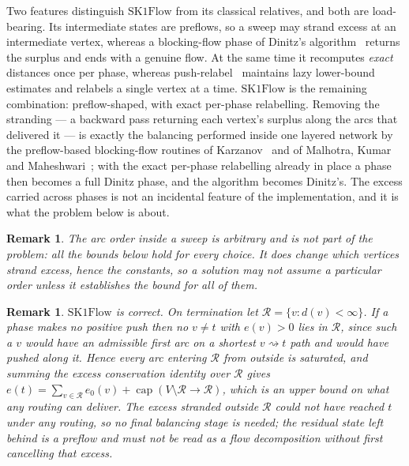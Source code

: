 \documentclass[10pt]{article}
\newtheorem{remark}[theorem]{Remark}
\newcommand{\SKF}{\text{SK1Flow}}
\DeclareMathOperator{\capa}{cap}
\begin{document}
Two features distinguish $\SKF$ from its classical relatives, and both are
load-bearing. Its intermediate states are preflows, so a sweep may strand
excess at an intermediate vertex, whereas a blocking-flow phase of Dinitz's
algorithm~\cite{Dinitz70} returns the surplus and ends with a genuine flow.
At the same time it recomputes \emph{exact} distances once per phase, whereas
push-relabel~\cite{GoldbergTarjan88} maintains lazy lower-bound estimates and
relabels a single vertex at a time. $\SKF$ is the remaining combination:
preflow-shaped, with exact per-phase relabelling.
Removing the stranding --- a backward pass returning each vertex's surplus along
the arcs that delivered it --- is exactly the balancing performed inside one
layered network by the preflow-based blocking-flow routines of
Karzanov~\cite{Karzanov74} and of Malhotra, Kumar and
Maheshwari~\cite{MKM78}; with the exact per-phase relabelling already in place a
phase then becomes a full Dinitz phase, and the algorithm becomes Dinitz's. The
excess carried across phases is not an incidental feature of the implementation,
and it is what the problem below is about.

\begin{remark}\label{rem:order}
The arc order inside a sweep is arbitrary and is not part of the problem: all
the bounds below hold for every choice. It does change \emph{which} vertices
strand excess, hence the constants, so a solution may not assume a particular
order unless it establishes the bound for all of them.
\end{remark}

\begin{remark}\label{rem:correct}
$\SKF$ is correct. On termination let $\mathcal{R}=\{v:d(v)<\infty\}$. If a
phase makes no positive push then no $v\ne t$ with $e(v)>0$ lies in
$\mathcal{R}$, since such a $v$ would have an admissible first arc on a shortest
$v\rightsquigarrow t$ path and would have pushed along it. Hence every arc
entering $\mathcal{R}$ from outside is saturated, and summing the excess
conservation identity over $\mathcal{R}$ gives
$e(t)=\sum_{v\in\mathcal{R}}e_0(v)+\capa(V\setminus\mathcal{R}\to\mathcal{R})$,
which is an upper bound on
what any routing can deliver. The excess stranded outside $\mathcal{R}$ could not have
reached $t$ under any routing, so no final balancing stage is needed; the
residual state left behind is a preflow and must not be read as a flow
decomposition without first cancelling that excess.
\end{remark}
\end{document}
